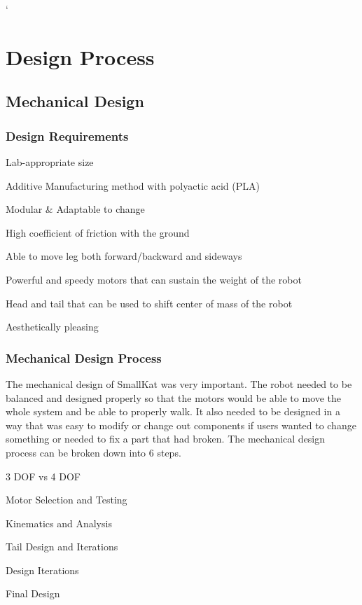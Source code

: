 `\section{Design Process} %


    \subsection{Mechanical Design} 

        \subsubsection{Design Requirements}
            \begin{Deliverables}
                \item Lab-appropriate size
                \item Additive Manufacturing method with polyactic acid (PLA)
                \item Modular \& Adaptable to change
                \item High coefficient of friction with the ground
                \item Able to move leg both forward/backward and sideways
                \item Powerful and speedy motors that can sustain the weight of the robot
                \item Head and tail that can be used to shift center of mass of the robot
                \item Aesthetically pleasing
            \end{Deliverables}
            
         \subsubsection{Mechanical Design Process}
            The mechanical design of SmallKat was very important. The robot needed to be balanced and designed properly so that the motors would be able to move the whole system and be able to properly walk. It also needed to be designed in a way that was easy to modify or change out components if users wanted to change something or needed to fix a part that had broken. The mechanical design process can be broken down into 6 steps. 
             \begin{Deliverables}
                \item 3 DOF vs 4 DOF
                \item Motor Selection and Testing
                \item Kinematics and Analysis
                \item Tail Design and Iterations
                \item Design Iterations
                \item Final Design
            \end{Deliverables}
        
